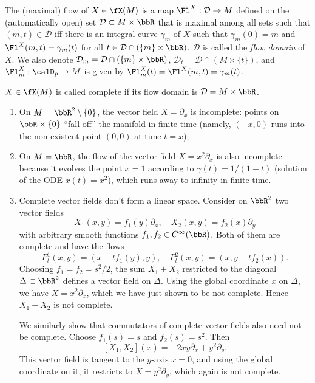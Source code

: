 \begin{defn}[Flow]
The (maximal) flow of $X\in\fX(M)$ is a map $\Fl^X:\mathcal{D}\to M$ defined on the (automatically open) set $\mathcal{D}\subset M\times \bbR $ that is maximal among all sets such that $(m,t)\in \mathcal{D}$ iff there is an integral curve $\gamma_m$ of $X$ such that $\gamma_m(0)=m$ and $\Fl^X(m,t)=\gamma_m(t)$ for all $t\in\mathcal{D}\cap (\{m\}\times\bbR )$. $\mathcal{D}$ is called the \emph{flow domain} of $X$. We also denote $\mathcal{D}_m=\mathcal{D}\cap (\{m\}\times\bbR )$, $\mathcal{D}_t=\mathcal{D}\cap (M\times\{t\})$, and $\Fl^X_m:\calD_p\to M$ is given by $\Fl^X_m(t)=\Fl^X(m,t)=\gamma_m(t)$.
\end{defn}



\begin{defn}
    $X\in\fX(M)$ is called complete if its flow domain is $\mathcal{D}=M\times\bbR $. 
\end{defn}
\begin{example}
\begin{enumerate}
    \item On $M=\bbR^2\setminus\{0\}$, the vector field $X=\partial_x$ is incomplete: points on $\bbR \times\{0\}$ ``fall off'' the manifold in finite time (namely, $(-x,0)$ runs into the non-existent point $(0,0)$ at time $t=x$);
    \item On $M=\bbR $, the flow of the vector field $X=x^2\partial_x$ is also incomplete because it evolves the point $x=1$ according to $\gamma(t)=1/(1-t)$ (solution of the ODE $\dot x(t)=x^2$), which runs away to infinity in finite time.
    \item Complete vector fields don't form a linear space. Consider on $\bbR^2$ two vector fields
    \[X_1(x,y)=f_1(y)\partial_x, \quad X_2(x,y)=f_2(x)\partial_y\]
    with arbitrary smooth functions $f_1,f_2\in C^\infty(\bbR)$. Both of them are complete and have the flows
    \[F^1_t(x,y)=(x+tf_1(y),y),\quad F^2_t(x,y)=(x,y+tf_2(x)).\]
    Choosing $f_1=f_2=s^2/2$, the sum $X_1+X_2$ restricted to the diagonal $\Delta\subset \bbR^2$ defines a vector field on $\Delta$. Using the global coordinate $x$ on $\Delta$, we have $X=x^2\partial_x$, which we have just shown to be not complete. Hence $X_1+X_2$ is not complete.

    We similarly show that commutators of complete vector fields also need not be complete. Choose $f_1(s)=s$ and $f_2(s)=s^2$. Then
    \[[X_1,X_2](x)=-2xy\partial_x+y^2\partial_y.\]
    This vector field is tangent to the $y$-axis $x=0$, and using the global coordinate on it, it restricts to $X=y^2\partial_y$, which again is not complete.
\end{enumerate}
\end{example}



